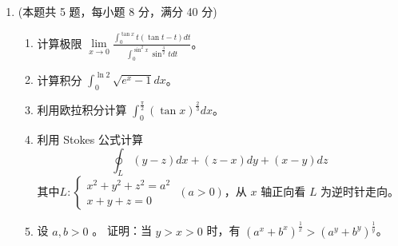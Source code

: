 \begin{enumerate}
{\begin{enumerate}
	\item
	\textbf{D}。沿坐标轴 $f(x,0)=x^{2}\sin\frac{1}{x^{2}}$，故
	\[
	f_{x}(0,0)=\lim_{x\to0}\frac{x^{2}\sin\frac{1}{x^{2}}}{x}=\lim_{x\to0}x\sin\frac{1}{x^{2}}=0 ,
	\]
	同理 $f_{y}(0,0)=0$。记 $\rho=\sqrt{x^{2}+y^{2}}$，则
	\[
	\frac{f(x,y)-f(0,0)-0\cdot x-0\cdot y}{\rho}=\rho\sin\frac{1}{\rho^{2}}\longrightarrow0 ,
	\]
	故 $f$ 在 $(0,0)$ 处可微。但当 $(x,y)\neq(0,0)$ 时
	\[
	f_{x}=2x\sin\frac{1}{\rho^{2}}-\frac{2x}{\rho^{2}}\cos\frac{1}{\rho^{2}} ,
	\]
	沿 $y=0$ 有 $f_{x}(x,0)=2x\sin\frac{1}{x^{2}}-\frac{2}{x}\cos\frac{1}{x^{2}}$，
	当 $x\to0$ 时无界振荡（例如取 $x_{k}=\frac{1}{\sqrt{2k\pi}}$ 得 $-2\sqrt{2k\pi}\to-\infty$），
	故 $f_{x}$ 在 $(0,0)$ 处不连续，$f_{y}$ 同理。即可微而偏导数不连续。
\end{enumerate}
}


\item
(本题共 5 题，每小题 8 分，满分 40 分)
\begin{enumerate}
	\item
	计算极限 $\lim\limits _{x \rightarrow 0} \frac{\int_{0}^{\tan x} t(\tan t-t) d t}{\int_{0}^{\sin ^{2} x} \sin ^{\frac{3}{2}} t d t}$。
	\item 
计算积分 $\int_{0}^{\ln 2} \sqrt{e^{x}-1} d x$。
	
	
	\item
	利用欧拉积分计算 $\int_{0}^{\frac{\pi}{2}}(\tan x)^{\frac{2}{3}} d x$。
	
	
	



\item
利用 Stokes 公式计算
\[ 
\oint_{L}(y-z) d x+(z-x) d y+(x-y) d z
 \]
 其中$L:\left\{\begin{array}{l}x^{2}+y^{2}+z^{2}=a^{2} \\ x+y+z=0\end{array}\right.$ $ (a>0) $，从 $x$ 轴正向看 $L$ 为逆时针走向。


\item
 设 $a, b>0$ 。 证明：当 $y>x>0$ 时，有 $\left(a^{x}+b^{x}\right)^{\frac{1}{x}}>\left(a^{y}+b^{y}\right)^{\frac{1}{y}}$。

\end{enumerate}



\end{enumerate}
